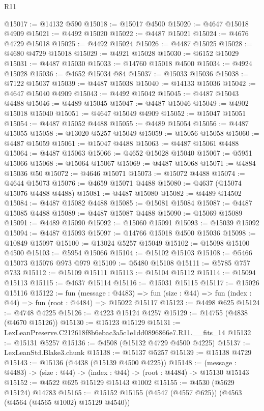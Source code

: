 \begin{lexlean}{R11}
\begin{coremodule}
@15017 := @14132 @590
@15018 := @15017 @4500
@15020 := @4647 @15018 @4909
@15021 := @4492 @15020
@15022 := @4487 @15021
@15024 := @4676 @4729 @15018
@15025 := @4492 @15024
@15026 := @4487 @15025
@15028 := @4680 @4729 @15018
@15029 := @4921 @15028
@15030 := @6152 @15029
@15031 := @4487 @15030
@15033 := @14760 @15018 @4500
@15034 := @4924 @15028
@15036 := @4652 @15034 @84
@15037 := @15033 @15036
@15038 := @7122 @15037
@15039 := @4487 @15038
@15040 := @14133 @15036
@15042 := @4647 @15040 @4909
@15043 := @4492 @15042
@15045 := @4487 @15043 @4488
@15046 := @4489 @15045
@15047 := @4487 @15046
@15049 := @4902 @15018 @15040
@15051 := @4647 @15049 @4909
@15052 := @15047 @15051
@15054 := @4487 @15052 @4488
@15055 := @4489 @15054
@15056 := @4487 @15055
@15058 := @13020 @5257 @15049
@15059 := @15056 @15058
@15060 := @4487 @15059
@15061 := @15047 @4488
@15063 := @4487 @15061 @4488
@15064 := @4487 @15063
@15066 := @4652 @15028 @15040
@15067 := @5951 @15066
@15068 := @15064 @15067
@15069 := @4487 @15068
@15071 := @4884 @15036 @50
@15072 := @4646 @15071
@15073 := @15072 @4488
@15074 := @4644 @15073
@15076 := @4659 @15071 @4488
@15080 := @4637 (@15074 @15076 @4488 @4488)
@15081 := @4487 @15080
@15082 := @4489 @14502
@15084 := @4487 @15082 @4488
@15085 := @15081 @15084
@15087 := @4487 @15085 @4488
@15089 := @4487 @15087 @4488
@15090 := @15069 @15089
@15091 := @4489 @15090
@15092 := @15060 @15091
@15093 := @15039 @15092
@15094 := @4487 @15093
@15097 := @14766 @15018 @4500 @15036
@15098 := @10849 @15097
@15100 := @13024 @5257 @15049
@15102 := @15098 @15100 @4500
@15103 := @5954 @15066
@15104 := @15102 @15103
@15108 := @5466 @15073 @15076 @973 @979
@15109 := @5480 @15108
@15111 := @5785 @757 @733
@15112 := @15109 @15111
@15113 := @15104 @15112
@15114 := @15094 @15113
@15115 := @4637 @15114
@15116 := @15031 @15115
@15117 := @15026 @15116
@15122 := fun (message : @4483) =>
  fun (size : @44) => fun (index : @44) => fun (root : @4484) => @15022 @15117
@15123 := @4498 @625
@15124 := @4748 @4225
@15126 := @4223 @15124 @4257
@15129 := @14755 (@4838 (@4670 @15126))
@15130 := @15123 @15129
@15131 := LexLeanPreserve.C212618f8b6ebac3a5c1e1dd0896866e7.R11.__fits_14
@15132 := @15131 @5257
@15136 := @4508 (@15132 @4729 @4500 @4225)
@15137 := LexLeanStd.Blake3.chunk
@15138 := @15137 @5257
@15139 := @15138 @4729
@15143 := @15136 (@4438 (@15139 @4500 @4225))
@15148 := (message : @4483) -> (size : @44) -> (index : @44) -> (root : @4484) -> @15130 @15143
@15152 := @4522 @625 @15129 @15143 @1002
@15155 := @4530 (@5629 @15124) @14783
@15165 := @15152 @15155 (@4547 (@4557 @625)) (@4563 (@4564 (@4565 @1002) @15129 @4540))

\end{coremodule}
\end{lexlean}
